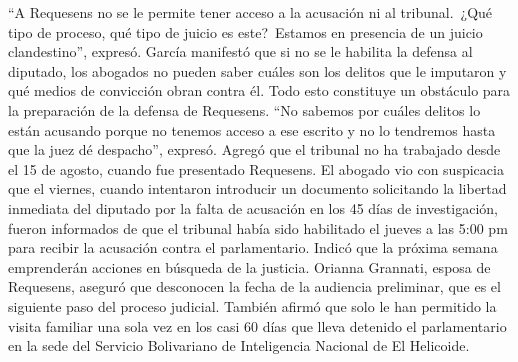 \documentclass{article}%
\begin{document}
\newline%
%
“A Requesens no se le permite tener acceso a la acusación ni al tribunal.~¿Qué tipo de proceso, qué tipo de juicio es este?~Estamos en presencia de un juicio clandestino”, expresó.%
\newline%
%
García manifestó que si no se le habilita la defensa al diputado, los abogados no pueden saber cuáles son los delitos que le imputaron y qué medios de convicción obran contra él. Todo esto constituye un obstáculo para la preparación de la defensa de Requesens.%
\newline%
%
“No sabemos por cuáles delitos lo están acusando porque no tenemos acceso a ese escrito y no lo tendremos hasta que la juez dé despacho”, expresó. Agregó que el tribunal no ha trabajado desde el 15 de agosto, cuando fue presentado Requesens.%
\newline%
%
El abogado vio con suspicacia que el viernes, cuando intentaron introducir un documento solicitando la libertad inmediata del diputado por la falta de acusación en los 45 días de investigación, fueron informados de que el tribunal había sido habilitado el jueves a las 5:00 pm para recibir la acusación contra el parlamentario. Indicó que la próxima semana emprenderán acciones en búsqueda de la justicia.%
\newline%
%
Orianna Grannati, esposa de Requesens, aseguró que desconocen la fecha de la audiencia preliminar, que es el siguiente paso del proceso judicial. También afirmó que solo le han permitido la visita familiar una sola vez en los casi 60 días que lleva detenido el parlamentario en la sede del Servicio Bolivariano de Inteligencia Nacional de El Helicoide.%
\newline%
%
\end{document}
